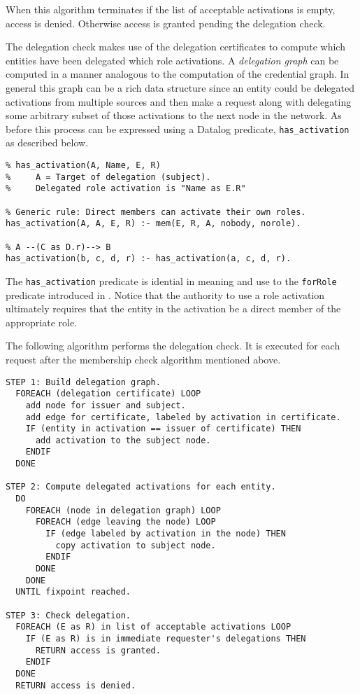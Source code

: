 \documentclass{article}
\newcommand{\predicate}[1]{\texttt{#1}}
\newcommand{\newterm}[1]{\textit{#1}}
\begin{document}
When this algorithm terminates if the list of acceptable activations is empty, access is denied.
Otherwise access is granted pending the delegation check.

The delegation check makes use of the delegation certificates to compute which entities have
been delegated which role activations. A \newterm{delegation graph} can be computed in a manner
analogous to the computation of the credential graph. In general this graph can be a rich data
structure since an entity could be delegated activations from multiple sources and then make a
request along with delegating some arbitrary subset of those activations to the next node in the
network. As before this process can be expressed using a Datalog predicate,
\predicate{has\_activation} as described below.

\begin{verbatim}
% has_activation(A, Name, E, R)
%     A = Target of delegation (subject).
%     Delegated role activation is "Name as E.R"

% Generic rule: Direct members can activate their own roles.
has_activation(A, A, E, R) :- mem(E, R, A, nobody, norole).

% A --(C as D.r)--> B
has_activation(b, c, d, r) :- has_activation(a, c, d, r).
\end{verbatim}

The \predicate{has\_activation} predicate is idential in meaning and use to the
\predicate{forRole} predicate introduced in \cite{Li:2002-05}. Notice that the authority to use
a role activation ultimately requires that the entity in the activation be a direct member of
the appropriate role.

The following algorithm performs the delegation check. It is executed for each request after the
membership check algorithm mentioned above.

\begin{verbatim}
STEP 1: Build delegation graph.
  FOREACH (delegation certificate) LOOP
    add node for issuer and subject.
    add edge for certificate, labeled by activation in certificate.
    IF (entity in activation == issuer of certificate) THEN
      add activation to the subject node.
    ENDIF
  DONE

STEP 2: Compute delegated activations for each entity.
  DO
    FOREACH (node in delegation graph) LOOP
      FOREACH (edge leaving the node) LOOP
        IF (edge labeled by activation in the node) THEN
          copy activation to subject node.
        ENDIF
      DONE
    DONE
  UNTIL fixpoint reached.
  
STEP 3: Check delegation.
  FOREACH (E as R) in list of acceptable activations LOOP
    IF (E as R) is in immediate requester's delegations THEN
      RETURN access is granted.
    ENDIF
  DONE
  RETURN access is denied.
\end{verbatim}
\end{document}
